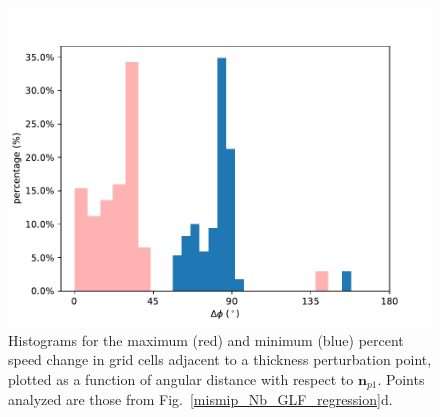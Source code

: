 \documentclass[tc, manuscript]{copernicus}
\begin{document}
\begin{figure}
	\centering
    \includegraphics[width=0.8\linewidth]{figs/perturb_theta_velchange.pdf}
    \caption{Histograms for the maximum (red) and minimum (blue) percent speed change in grid cells adjacent to a thickness perturbation point, plotted as a function of angular distance with respect to $\mathbf{n}_{p1}$. Points analyzed are those from Fig.~\ref{mismip_Nb_GLF_regression}d.}
	\label{perturb_theta_velchange}
\end{figure}

\end{document}
